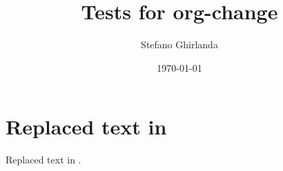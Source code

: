 \documentclass[11pt]{article}
\author{Stefano Ghirlanda}
\date{\today}
\title{Tests for org-change}
\begin{document}
\maketitle
\tableofcontents


\section{Replaced text in }
\label{sec:orgaf22c57}

Replaced text in .

\end{document}
